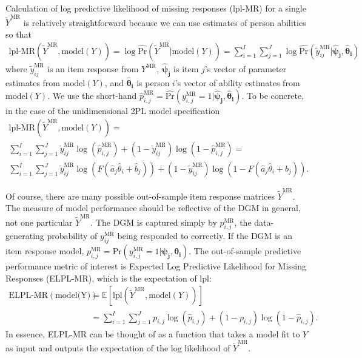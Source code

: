 \documentclass[
  english,
  man,floatsintext]{apa7}
\begin{document}
Calculation of log predictive likelihood of missing responses (lpl-MR) for a single \(\tilde Y^{\text{MR}}\) is relatively straightforward because we can use estimates of person abilities so that
\begin{align}
\text{lpl-MR}(\tilde Y^{\text{MR}}, \text{model}(Y)) = \log \hat{\text{Pr}}(\tilde Y^{\text{MR}} | \text{model}(Y)) = \sum_{i=1}^{I} \sum_{j=1}^{J} \log \hat{\text{Pr}}(\tilde y_{ij}^{\text{MR}} | \bm{\hat\psi_j}, \bm{\hat\theta_i})
\end{align}
where \(\tilde y_{ij}^{\text{MR}}\) is an item response from \(Y^{\text{MR}}\), \(\bm{\hat\psi_j}\) is item \(j\)'s vector of parameter estimates from \(\text{model}(Y)\), and \(\bm{\hat\theta_i}\) is person \(i\)'s vector of ability estimates from \(\text{model}(Y)\). We use the short-hand \(\hat p_{i, j}^{\text{MR}} = \hat{\text{Pr}}(y_{i, j}^{\text{MR}} = 1 | \bm{\hat\psi_j}, \bm{\hat\theta_i})\). To be concrete, in the case of the unidimensional 2PL model specification
\begin{align}
\text{lpl-MR}(\tilde Y^{\text{MR}}, \text{model}(Y)) = \\ \sum_{i=1}^{I} \sum_{j=1}^{J} \tilde y_{ij}^{\text{MR}} \log \left(\hat p_{i, j}^{\text{MR}}\right) + (1 - \tilde y_{ij}^{\text{MR}})\log\left(1 - \hat p_{i, j}^{\text{MR}}\right) = \\\sum_{i=1}^{I} \sum_{j=1}^{J} \tilde y_{ij}^{\text{MR}} \log \left(F(\hat a_j\hat \theta_i + \hat b_j)\right) + (1 - \tilde y_{ij}^{\text{MR}})\log\left(1 - F(\hat a_j\hat \theta_i + \hat b_j)\right).
\end{align}

Of course, there are many possible out-of-sample item response matrices \(\tilde Y^{\text{MR}}\). The measure of model performance should be reflective of the DGM in general, not one particular \(\tilde Y^{\text{MR}}\). The DGM is captured simply by \(p_{i, j}^{\text{MR}}\), the data-generating probability of \(y_{ij}^{\text{MR}}\) being responded to correctly. If the DGM is an item response model, \(p_{i, j}^{\text{MR}} = \text{Pr}(y_{i, j}^{\text{MR}} = 1 | \bm{\psi_j}, \bm{\theta_i})\). The out-of-sample predictive performance metric of interest is Expected Log Predictive Likelihood for Missing Responses (ELPL-MR), which is the expectation of lpl:
\begin{align}
\text{ELPL-MR}(\text{model(Y)}) &= \mathbb{E}\left[\text{lpl}(\tilde Y^{\text{MR}}, \text{model}(Y))\right] \\ &= \sum_{i=1}^{I} \sum_{j=1}^{J} p_{i, j} \log (\hat p_{i, j}) + (1 - {p_{i, j}})\log(1 - \hat p_{i, j}) \label{eq:elplmr2}.
\end{align}
In essence, ELPL-MR can be thought of as a function that takes a model fit to \(Y\) as input and outputs the expectation of the log likelihood of \(\tilde Y^{\text{MR}}\).
\end{document}
